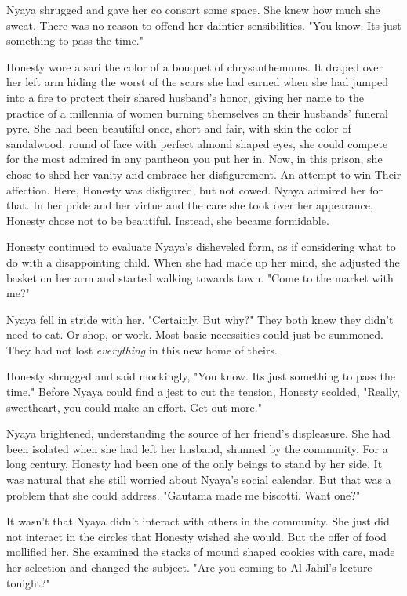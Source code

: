 \documentclass{amsart}
\begin{document}
Nyaya shrugged and gave her co consort some space. She knew how much she sweat. There was no reason to offend her daintier sensibilities. "You know. Its just something to pass the time." 

Honesty wore a sari the color of a bouquet of chrysanthemums. It draped over her left arm hiding the worst of the scars she had earned when she had jumped into a fire to protect their shared husband's honor, giving her name to the practice of a millennia of women burning themselves on their husbands' funeral pyre. She had been beautiful once, short and fair, with skin the color of sandalwood, round of face with perfect almond shaped eyes, she could compete for the most admired in any pantheon you put her in. Now, in this prison, she chose to shed her vanity and embrace her disfigurement. An attempt to win Their affection. Here, Honesty was disfigured, but not cowed. Nyaya admired her for that. In her pride and her virtue and the care she took over her appearance, Honesty chose not to be beautiful. Instead, she became formidable.

Honesty continued to evaluate Nyaya's disheveled form, as if considering what to do with a disappointing child. When she had made up her mind, she adjusted the basket on her arm and started walking towards town. "Come to the market with me?"

Nyaya fell in stride with her. "Certainly. But why?" They both knew they didn't need to eat. Or shop, or work. Most basic necessities could just be summoned. They had not lost \emph{everything} in this new home of theirs.

Honesty shrugged and said mockingly, "You know. Its just something to pass the time." Before Nyaya could find a jest to cut the tension, Honesty scolded, "Really, sweetheart, you could make an effort. Get out more."

Nyaya brightened, understanding the source of her friend's displeasure. She had been isolated when she had left her husband, shunned by the community. For a long century, Honesty had been one of the only beings to stand by her side. It was natural that she still worried about Nyaya's social calendar. But that was a problem that she could address. "Gautama made me biscotti. Want one?"

It wasn't that Nyaya didn't interact with others in the community. She just did not interact in the circles that Honesty wished she would. But the offer of food mollified her. She examined the stacks of mound shaped cookies with care, made her selection and changed the subject. "Are you coming to Al Jahil's lecture tonight?" 
\end{document}
